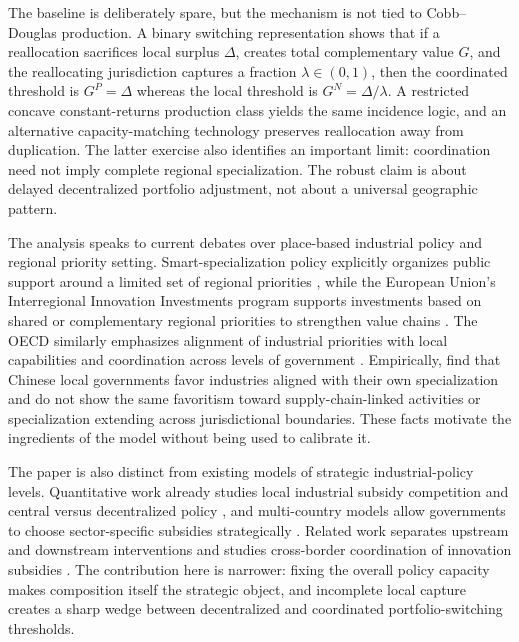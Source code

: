 The baseline is deliberately spare, but the mechanism is not tied to Cobb--Douglas production. A binary switching representation shows that if a reallocation sacrifices local surplus $\Delta$, creates total complementary value $G$, and the reallocating jurisdiction captures a fraction $\lambda\in(0,1)$, then the coordinated threshold is $G^P=\Delta$ whereas the local threshold is $G^N=\Delta/\lambda$. A restricted concave constant-returns production class yields the same incidence logic, and an alternative capacity-matching technology preserves reallocation away from duplication. The latter exercise also identifies an important limit: coordination need not imply complete regional specialization. The robust claim is about delayed decentralized portfolio adjustment, not about a universal geographic pattern.

The analysis speaks to current debates over place-based industrial policy and regional priority setting. Smart-specialization policy explicitly organizes public support around a limited set of regional priorities \citep{ForayEichlerKeller2021}, while the European Union's Interregional Innovation Investments program supports investments based on shared or complementary regional priorities to strengthen value chains \citep{EISMEA2026}. The OECD similarly emphasizes alignment of industrial priorities with local capabilities and coordination across levels of government \citep{OECD2025}. Empirically, \citet{TianWangZhang2027} find that Chinese local governments favor industries aligned with their own specialization and do not show the same favoritism toward supply-chain-linked activities or specialization extending across jurisdictional boundaries. These facts motivate the ingredients of the model without being used to calibrate it.

The paper is also distinct from existing models of strategic industrial-policy levels. Quantitative work already studies local industrial subsidy competition and central versus decentralized policy \citep{ChenLi2026}, and multi-country models allow governments to choose sector-specific subsidies strategically \citep{WangXuYangZhu2024}. Related work separates upstream and downstream interventions \citep{Fischer2017,FischerGreakerRosendahl2018} and studies cross-border coordination of innovation subsidies \citep{BorotaMilicevicEtAl2026}. The contribution here is narrower: fixing the overall policy capacity makes composition itself the strategic object, and incomplete local capture creates a sharp wedge between decentralized and coordinated portfolio-switching thresholds.

